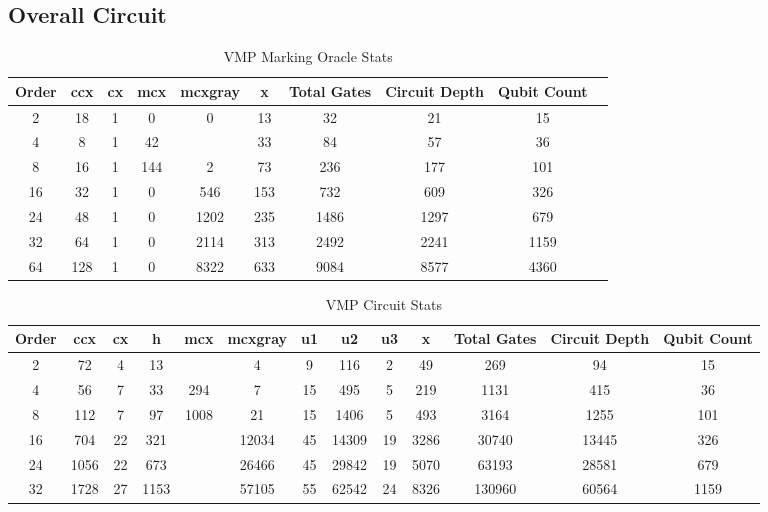 \documentclass[10pt]{proc}
\theoremstyle{definition}
\theoremstyle{remark}
\begin{document}
\vfill

\subsection{Overall Circuit}


\begin{table}[t]
  \centering
  \begin{tabular}{|c||c|c|c|c|c||c|c|c|c|} 
   \hline
   Order & ccx & cx & mcx & mcxgray & x & Total Gates & Circuit Depth & Qubit Count \\
   \hline
   2 & 18 & 1 & 0 & 0 & 13 & 32 & 21 & 15 \\
    4 & 8 & 1 & 42 &  & 33 & 84 & 57 & 36 \\
    8 & 16 & 1 & 144 & 2 & 73 & 236 & 177 & 101 \\
    16 & 32 & 1 & 0 & 546 & 153 & 732 & 609 & 326 \\
    24 & 48 & 1 & 0 & 1202 & 235 & 1486 & 1297 & 679 \\
    32 & 64 & 1 & 0 & 2114 & 313 & 2492 & 2241 & 1159 \\
    64 & 128 & 1 & 0 & 8322 & 633 & 9084 & 8577 & 4360 \\
  \hline
  \end{tabular}
  \caption{VMP Marking Oracle Stats}
  \label{table:marking_oracle_stats}
\end{table}

\begin{table}[t]
  \centering
  \begin{tabular}{|c||c|c|c|c|c|c|c|c|c||c|c|c|} 
   \hline
   Order & ccx & cx & h & mcx & mcxgray & u1 & u2 & u3 & x & Total Gates & Circuit Depth & Qubit Count \\
   \hline
   2 &  72 & 4 & 13 &  & 4 & 9 & 116 & 2 & 49 & 269 & 94 & 15 \\
  4 &  56 & 7 & 33 & 294 & 7 & 15 & 495 & 5 & 219 & 1131 & 415 & 36 \\
  8 &  112 & 7 & 97 & 1008 & 21 & 15 & 1406 & 5 & 493 & 3164 & 1255 & 101 \\
  16 &  704 & 22 & 321 &  & 12034 & 45 & 14309 & 19 & 3286 & 30740 & 13445 & 326 \\
  24 &  1056 & 22 & 673 &  & 26466 & 45 & 29842 & 19 & 5070 & 63193 & 28581 & 679 \\
32 & 1728 & 27 & 1153 &  & 57105 & 55 & 62542 & 24 & 8326 & 130960 & 60564 & 1159 \\
      \hline
  \end{tabular}
  \caption{VMP Circuit Stats}
  \label{table:circuit_stats}
\end{table}
\end{document}

